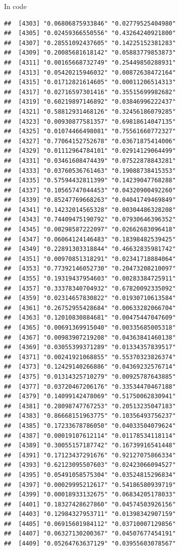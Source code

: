 \documentclass[ignorenonframetext,]{beamer}
\begin{document}
\begin{frame}[fragile]{In code}
\begin{verbatim}
##  [4303] "0.06806875933846" "0.02779525404980"
##  [4305] "0.02459366550556" "0.43264240921800"
##  [4307] "0.28551092437605" "0.14225152381283"
##  [4309] "0.20085681618142" "0.05883779853873"
##  [4311] "0.00165668732749" "0.25449850288931"
##  [4313] "0.05420215946032" "0.00872638472164"
##  [4315] "0.01712821614605" "0.00011206514313"
##  [4317] "0.02716597301416" "0.35515699982682"
##  [4319] "0.60219897146892" "0.03846996222437"
##  [4321] "0.58812931468126" "0.32456186079285"
##  [4323] "0.00930877581357" "0.69818614047135"
##  [4325] "0.01074466498081" "0.75561660772327"
##  [4327] "0.77064152752678" "0.03671875414006"
##  [4329] "0.01112964784101" "0.02914129064499"
##  [4331] "0.03461608474439" "0.07522878843281"
##  [4333] "0.03760536761463" "0.19088738415353"
##  [4335] "0.57594432811399" "0.14239047768288"
##  [4337] "0.10565747044453" "0.04320900492260"
##  [4339] "0.85247769668263" "0.04041749469849"
##  [4341] "0.14232014565328" "0.00304486328208"
##  [4343] "0.74409475190792" "0.07930646396352"
##  [4345] "0.00298587222097" "0.02662683096418"
##  [4347] "0.06064124146483" "0.18398482539425"
##  [4349] "0.22891303318844" "0.46632835981742"
##  [4351] "0.00970851318291" "0.02341718884064"
##  [4353] "0.77392146052730" "0.20473208210097"
##  [4355] "0.19319437954603" "0.00283384725911"
##  [4357] "0.33378340704932" "0.67820092335092"
##  [4359] "0.02314657830822" "0.01930710613584"
##  [4361] "0.26752955428684" "0.00633282066704"
##  [4363] "0.12010830884681" "0.00475447047609"
##  [4365] "0.00691369915040" "0.00335685005318"
##  [4367] "0.00983907219208" "0.04363841460138"
##  [4369] "0.03055399371289" "0.01334357839517"
##  [4371] "0.00241921068855" "0.55370323826374"
##  [4373] "0.12429140266886" "0.04369232576714"
##  [4375] "0.01314325710279" "0.00925787643885"
##  [4377] "0.03720467206176" "0.33534470467188"
##  [4379] "0.14099142478069" "0.51750062830941"
##  [4381] "0.28098747767253" "0.20513235047183"
##  [4383] "0.86668151963775" "0.10356493756237"
##  [4385] "0.17233678786050" "0.04033504079624"
##  [4387] "0.00019107612114" "0.01178534118114"
##  [4389] "0.30055157187742" "0.16739916541448"
##  [4391] "0.17123437291676" "0.92127075866334"
##  [4393] "0.62123095507603" "0.02423066094527"
##  [4395] "0.05491058575304" "0.03524815296834"
##  [4397] "0.00029995212617" "0.54186580939719"
##  [4399] "0.00018933132675" "0.06834205178033"
##  [4401] "0.18327428627860" "0.04574503926156"
##  [4403] "0.12984327953711" "0.01398342907159"
##  [4405] "0.06915601984112" "0.03710007129856"
##  [4407] "0.06327130200367" "0.04507677454191"
##  [4409] "0.05264763637129" "0.03955603078567"

\end{verbatim}
\end{frame}
\end{document}
